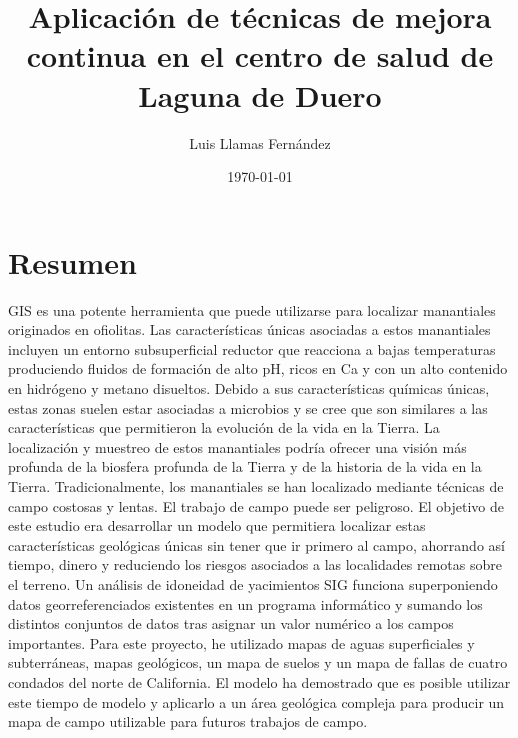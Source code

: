 \documentclass[12pt, a4paper]{report}
\begin{document}
\title{Aplicación de técnicas de mejora continua en el centro de salud de Laguna de Duero}
\author{Luis Llamas Fernández}
\date{\today}
\maketitle

\chapter*{Resumen}
GIS es una potente herramienta que puede utilizarse para localizar manantiales originados en ofiolitas. Las características únicas asociadas a estos manantiales incluyen un entorno subsuperficial reductor que reacciona a bajas temperaturas produciendo fluidos de formación de alto pH, ricos en Ca y con un alto contenido en hidrógeno y metano disueltos. Debido a sus características químicas únicas, estas zonas suelen estar asociadas a microbios y se cree que son similares a las características que permitieron la evolución de la vida en la Tierra. La localización y muestreo de estos manantiales podría ofrecer una visión más profunda de la biosfera profunda de la Tierra y de la historia de la vida en la Tierra. Tradicionalmente, los manantiales se han localizado mediante técnicas de campo costosas y lentas. El trabajo de campo puede ser peligroso. El objetivo de este estudio era desarrollar un modelo que permitiera localizar estas características geológicas únicas sin tener que ir primero al campo, ahorrando así tiempo, dinero y reduciendo los riesgos asociados a las localidades remotas sobre el terreno. Un análisis de idoneidad de yacimientos SIG funciona superponiendo datos georreferenciados existentes en un programa informático y sumando los distintos conjuntos de datos tras asignar un valor numérico a los campos importantes. Para este proyecto, he utilizado mapas de aguas superficiales y subterráneas, mapas geológicos, un mapa de suelos y un mapa de fallas de cuatro condados del norte de California. El modelo ha demostrado que es posible utilizar este tiempo de modelo y aplicarlo a un área geológica compleja para producir un mapa de campo utilizable para futuros trabajos de campo.
\end{document}
